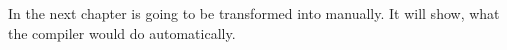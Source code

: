     
    In the next chapter \ndpn is going to be transformed into \ndpv
    manually. It will show, what the compiler would do automatically.
  
  
      
    
  
